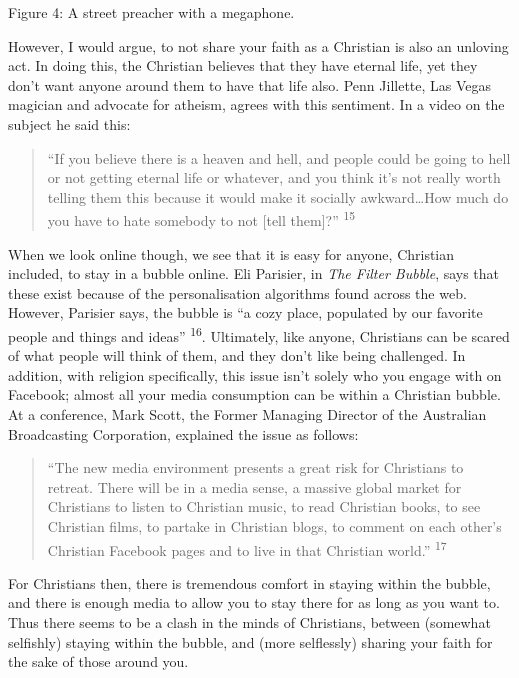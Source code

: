 \documentclass[]{article}
\begin{document}
Figure 4: A street preacher with a megaphone.

However, I would argue, to not share your faith as a Christian is also
an unloving act. In doing this, the Christian believes that they have
eternal life, yet they don't want anyone around them to have that life
also. Penn Jillette, Las Vegas magician and advocate for atheism, agrees
with this sentiment. In a video on the subject he said this:

\begin{quote}
``If you believe there is a heaven and hell, and people could be going
to hell or not getting eternal life or whatever, and you think it's not
really worth telling them this because it would make it socially
awkward\ldots{}How much do you have to hate somebody to not {[}tell
them{]}?'' \textsuperscript{15}
\end{quote}

When we look online though, we see that it is easy for anyone, Christian
included, to stay in a bubble online. Eli Parisier, in \emph{The Filter
Bubble}, says that these exist because of the personalisation algorithms
found across the web. However, Parisier says, the bubble is ``a cozy
place, populated by our favorite people and things and ideas''
\textsuperscript{16}. Ultimately, like anyone, Christians can be scared
of what people will think of them, and they don't like being challenged.
In addition, with religion specifically, this issue isn't solely who you
engage with on Facebook; almost all your media consumption can be within
a Christian bubble. At a conference, Mark Scott, the Former Managing
Director of the Australian Broadcasting Corporation, explained the issue
as follows:

\begin{quote}
``The new media environment presents a great risk for Christians to
retreat. There will be in a media sense, a massive global market for
Christians to listen to Christian music, to read Christian books, to see
Christian films, to partake in Christian blogs, to comment on each
other's Christian Facebook pages and to live in that Christian world.''
\textsuperscript{17}
\end{quote}

For Christians then, there is tremendous comfort in staying within the
bubble, and there is enough media to allow you to stay there for as long
as you want to. Thus there seems to be a clash in the minds of
Christians, between (somewhat selfishly) staying within the bubble, and
(more selflessly) sharing your faith for the sake of those around you.
\end{document}
